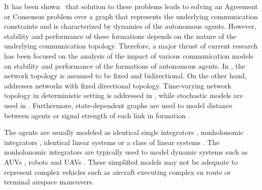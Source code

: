 \documentclass[letter,onecolumn,12pt]{aiaa-tc}
\newcommand{\1}{1_n}
\begin{document}
It has been shown~\cite{jadbabaie03,tanner05,saber07} that solution to these
problems leads to solving an Agreement or Consensus problem over a graph that represents the underlying communication
constraints and is characterized by dynamics of the autonomous agents. However, stability and
performance of these formations depends on the nature of the underlying communication topology.  Therefore, a major thrust of current research has been focused on the analysis of the impact of various communication models on stability and performance of the formations of autonomous agents. In \cite{fax04}, the network topology is assumed to be fixed and bidirectional. On the other hand, \cite{Francis-directed} addresses networks with fixed directional topology. Time-varying network topology in deterministic setting is addressed in \cite{jadbabaie03,Moreau,lin05}, while  stochastic models are used in \cite{mesbahi, Stilwell, Stilwell2}. Furthermore, state-dependent graphs are used to model distance between agents
or signal strength of each link in formation \cite{mesbahi}.

The agents are usually modeled as identical single integrators \cite{jadbabaie03,Moreau},  nonholonomic integrators
\cite{ Francis-directed,beard:coop-book,Leonard}, identical linear systems \cite{fax04} or a class of linear systems
\cite{dandrea}. The nonholonomic integrators are typically used to model dynamic systems such as AUVs \cite{Leonard},
robots \cite{Francis-directed,lin05} and UAVs \cite{mclain,beard:coop-book}. These simplified models may not
be adequate to represent complex vehicles such as aircraft executing complex en route or terminal airspace maneuvers.
\end{document}
